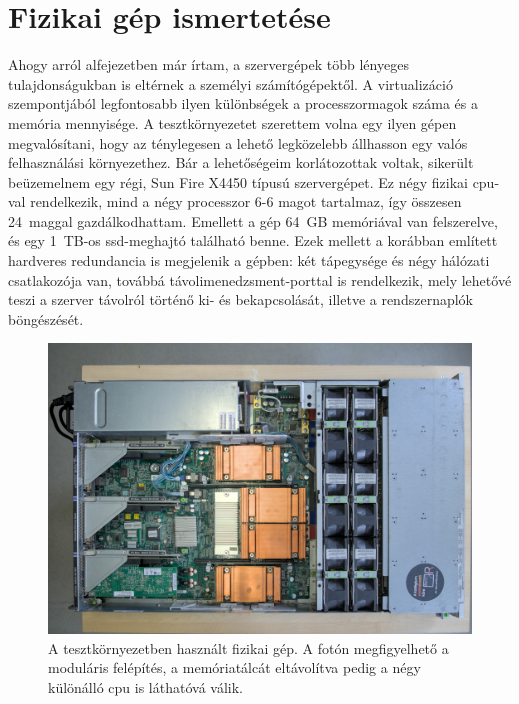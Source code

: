 \section{Fizikai gép ismertetése}
Ahogy arról  alfejezetben már írtam, a szervergépek több lényeges tulajdonságukban is eltérnek a személyi számítógépektől. A virtualizáció szempontjából legfontosabb ilyen különbségek a processzormagok száma és a memória mennyisége. A tesztkörnyezetet szerettem volna egy ilyen gépen megvalósítani, hogy az ténylegesen a lehető legközelebb állhasson egy valós felhasználási környezethez. Bár a lehetőségeim korlátozottak voltak, sikerült beüzemelnem egy régi, Sun Fire X4450 típusú szervergépet. Ez négy fizikai \acrshort{cpu}-val rendelkezik, mind a négy processzor 6-6 magot tartalmaz, így összesen 24~maggal gazdálkodhattam. Emellett a gép 64~GB memóriával van felszerelve, és egy 1~TB-os \acrshort{ssd}-meghajtó található benne. Ezek mellett a korábban említett hardveres redundancia is megjelenik a gépben: két tápegysége és négy hálózati csatlakozója van, továbbá távolimenedzsment-porttal is rendelkezik, mely lehetővé teszi a szerver távolról történő ki- és bekapcsolását, illetve a rendszernaplók böngészését.

\begin{figure}[!ht]
	\centering
	\includegraphics[width=15cm]{figures/szerver.jpg}
	\caption{A tesztkörnyezetben használt fizikai gép. A fotón megfigyelhető a moduláris felépítés, a memóriatálcát eltávolítva pedig a négy különálló \acrshort{cpu} is láthatóvá válik.}
	\label{fig:server}
\end{figure}

